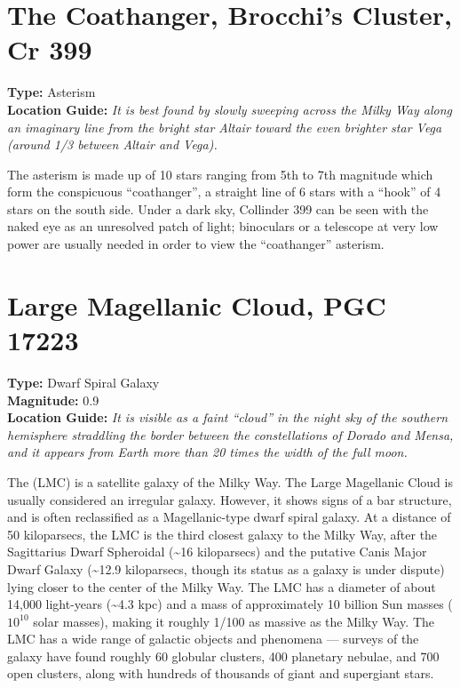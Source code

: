 \section{The Coathanger, Brocchi's Cluster, Cr 399}
\textbf{Type:} Asterism \\
\textbf{Location Guide:} \textit{It is best found by slowly sweeping across the Milky Way along an imaginary line from the bright star Altair toward the even brighter star Vega (around 1/3 between Altair and Vega).}

The asterism is made up of 10 stars ranging from 5th to 7th magnitude which form the conspicuous ``coathanger'', a straight line of 6 stars with a ``hook'' of 4 stars on the south side. Under a dark sky, Collinder 399 can be seen with the naked eye as an unresolved patch of light; binoculars or a telescope at very low power are usually needed in order to view the ``coathanger'' asterism. 

\section{Large Magellanic Cloud, PGC 17223}
\textbf{Type:} Dwarf Spiral Galaxy \\
\textbf{Magnitude:} 0.9 \\ 
\textbf{Location Guide:} \textit{It is visible as a faint ``cloud'' in the night sky of the southern hemisphere straddling the border between the constellations of Dorado and Mensa, and it appears from Earth more than 20 times the width of the full moon.}

The  (LMC) is a satellite galaxy of the Milky Way. The Large Magellanic Cloud is usually considered an irregular galaxy. However, it shows signs of a bar structure, and is often reclassified as a Magellanic-type dwarf spiral galaxy. At a distance of 50 kiloparsecs, the LMC is the third closest galaxy to the Milky Way, after the Sagittarius Dwarf Spheroidal (\textasciitilde16 kiloparsecs) and the putative Canis Major Dwarf Galaxy (\textasciitilde12.9 kiloparsecs, though its status as a galaxy is under dispute) lying closer to the center of the Milky Way. The LMC has a diameter of about 14,000 light-years (\textasciitilde4.3 kpc) and a mass of approximately 10 billion Sun masses ($10^{10}$ solar masses), making it roughly 1/100 as massive as the Milky Way. The LMC has a wide range of galactic objects and phenomena --- surveys of the galaxy have found roughly 60 globular clusters, 400 planetary nebulae, and 700 open clusters, along with hundreds of thousands of giant and supergiant stars.

